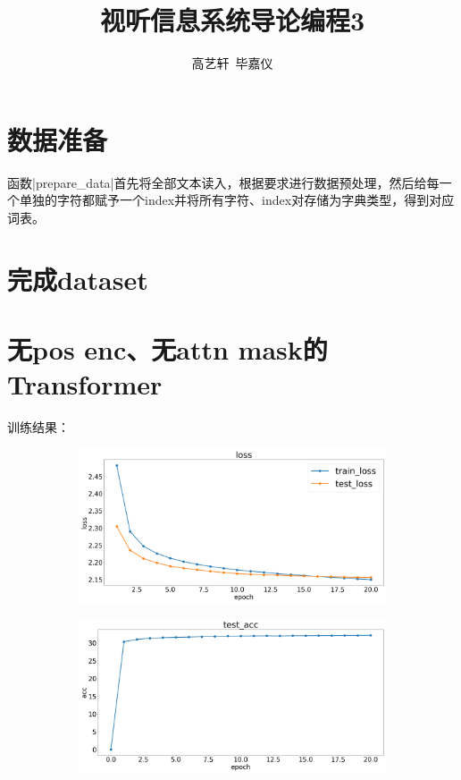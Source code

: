 \documentclass[11pt, a4paper]{article}
\title{\Large{\bf{视听信息系统导论编程3}}}
\author{高艺轩\ 毕嘉仪}
\date{}
\begin{document}
\maketitle
\section{数据准备}
函数|prepare_data|首先将全部文本读入，根据要求进行数据预处理，然后给每一个单独的字符都赋予一个index并将所有字符、index对存储为字典类型，得到对应词表。

\section{完成dataset}

\section{无pos enc、无attn mask的Transformer}
训练结果：\begin{figure}[H]
    \hfill
    \begin{subfigure}[t]{0.45\linewidth}
        \includegraphics[width=\textwidth]{img/3-1.png}
    \end{subfigure}
    \hfill
    \begin{subfigure}[t]{0.45\linewidth}
        \includegraphics[width=\textwidth]{img/3-2.png}
    \end{subfigure}
    \hfill
\end{figure}
\end{document}
